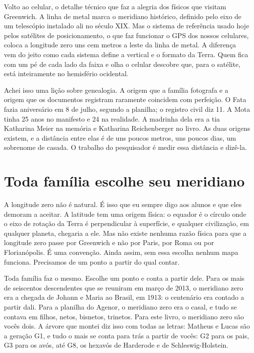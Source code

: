 \documentclass[
  brazilian,
  11pt,
  openany]{book}
\begin{document}
Volto ao celular, o detalhe técnico que faz a alegria dos físicos que
visitam Greenwich. A linha de metal marca o meridiano histórico,
definido pelo eixo de um telescópio instalado ali no século XIX. Mas o
sistema de referência usado hoje pelos satélites de posicionamento, o
que faz funcionar o GPS dos nossos celulares, coloca a longitude zero
uns cem metros a leste da linha de metal. A diferença vem do jeito como
cada sistema define a vertical e o formato da Terra. Quem fica com um pé
de cada lado da faixa e olha o celular descobre que, para o satélite,
está inteiramente no hemisfério ocidental.

Achei isso uma lição sobre genealogia. A origem que a família fotografa
e a origem que os documentos registram raramente coincidem com
perfeição. O Fata fazia aniversário em 8 de julho, segundo a planilha; o
registro civil diz 11. A Mota tinha 25 anos no manifesto e 24 na
realidade. A madrinha dela era a tia Katharina Meier na memória e
Katharina Reichenberger no livro. As duas origens existem, e a distância
entre elas é de uns poucos metros, uns poucos dias, um sobrenome de
casada. O trabalho do pesquisador é medir essa distância e dizê-la.

\section{Toda família escolhe seu
meridiano}\label{toda-famuxedlia-escolhe-seu-meridiano}

A longitude zero não é natural. É isso que eu sempre digo aos alunos e
que eles demoram a aceitar. A latitude tem uma origem física: o equador
é o círculo onde o eixo de rotação da Terra é perpendicular à
superfície, e qualquer civilização, em qualquer planeta, chegaria a ele.
Mas não existe nenhuma razão física para que a longitude zero passe por
Greenwich e não por Paris, por Roma ou por Florianópolis. É uma
convenção. Ainda assim, sem essa escolha nenhum mapa funciona.
Precisamos de um ponto a partir do qual contar.

Toda família faz o mesmo. Escolhe um ponto e conta a partir dele. Para
os mais de seiscentos descendentes que se reuniram em março de 2013, o
meridiano zero era a chegada de Johann e Maria ao Brasil, em 1913: o
centenário era contado a partir dali. Para a planilha do Agenor, o
meridiano zero era o casal, e tudo se contava em filhos, netos,
bisnetos, trinetos. Para este livro, o meridiano zero são vocês dois. A
árvore que montei diz isso com todas as letras: Matheus e Lucas são a
geração G1, e tudo o mais se conta para trás a partir de vocês: G2 para
os pais, G3 para os avós, até G8, os hexavós de Harderode e de
Schleswig-Holstein.
\end{document}
